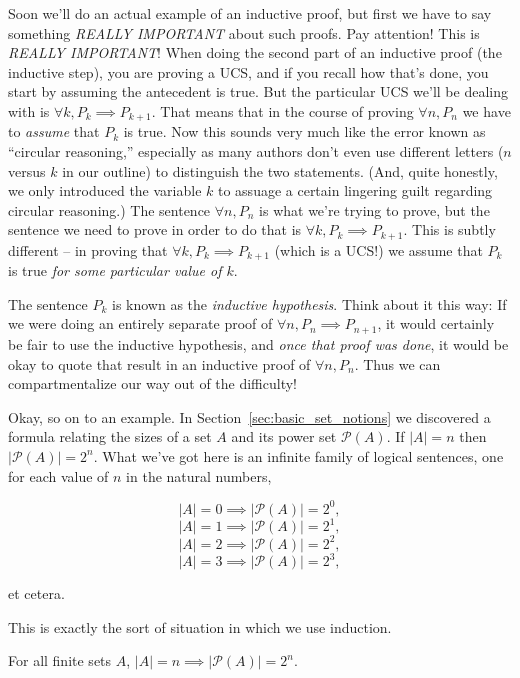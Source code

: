 Soon we'll do an actual example of an inductive 
proof, but first we have to say something \emph{REALLY IMPORTANT}
about such proofs.  Pay attention! This is \emph{REALLY IMPORTANT}!
When doing the second part of an inductive proof (the inductive step),
you are proving a UCS, and if you recall how that's done, you start
by assuming the antecedent is true.  But the particular UCS we'll
be dealing with is $\forall k,  P_k \implies P_{k+1}$.  That means
that in the course of proving $\forall n,  P_n$ we have to \emph{assume}
 that $P_k$ is true.  Now this sounds very much like the error known
as ``circular reasoning,'' especially as many authors don't even
use different letters ($n$ versus $k$ in our outline) to distinguish
the two statements.  (And, quite honestly, we only introduced the variable
$k$ to assuage a certain lingering guilt regarding circular reasoning.)
The sentence $\forall n,  P_n$ is what we're trying to prove, but the
sentence we need to prove in order to do that is $\forall k,  P_k \implies P_{k+1}$.
This is subtly different -- in proving that $\forall k,  P_k \implies P_{k+1}$
(which is a UCS!) we assume that $P_k$ is true {\em for some particular value of $k$}.

The sentence $P_k$ is known as the 
\emph{inductive hypothesis}.
Think about it this way:  If we were doing an entirely separate
proof of $\forall n,  P_n \implies P_{n+1}$, it would certainly be fair
to use the inductive hypothesis, and \emph{once that proof was done}, 
it would be okay to quote that result in an inductive proof of 
$\forall n,  P_n$.  Thus we can compartmentalize our way out of the
difficulty!

Okay, so on to an example.  In Section~\ref{sec:basic_set_notions} 
we discovered a formula relating the sizes of a set $A$ and its 
power set ${\mathcal P}(A)$.  If $|A| = n$ then $|{\mathcal P}(A)| = 2^n$.
What we've got here is an infinite family of logical sentences, one for 
each value of $n$ in the natural numbers,

\[ |A| = 0 \implies |{\mathcal P}(A)| = 2^0, \]
\[ |A| = 1 \implies |{\mathcal P}(A)| = 2^1, \]
\[ |A| = 2 \implies |{\mathcal P}(A)| = 2^2, \]
\[ |A| = 3 \implies |{\mathcal P}(A)| = 2^3, \]

\noindent et cetera.

This is exactly the sort of situation in which we use induction.

\begin{thm} For all finite sets $A$, $\displaystyle |A| = n \implies  |{\mathcal P}(A)| = 2^n$.
\end{thm}

